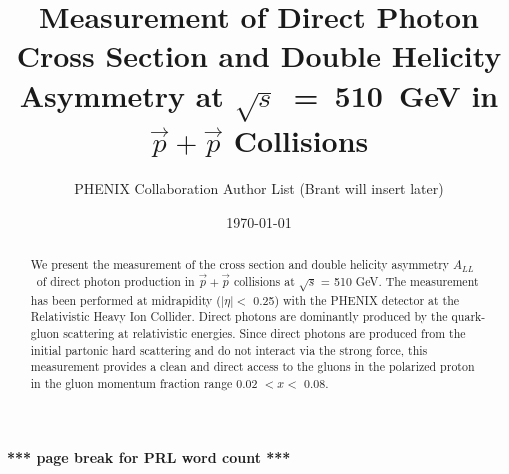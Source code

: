 \documentclass[twocolumn,letterpaper,aps,prl,longbibliography,superscriptaddress,floatfix]{revtex4-2}
\newcommand{\ALL}{\ensuremath{A_{LL}}}
\begin{document}


\title{Measurement of Direct Photon Cross Section and Double Helicity Asymmetry at \mbox{$\sqrt{s}$ = 510 GeV} in \mbox{$\vec{p}+\vec{p}$} Collisions}

\author{PHENIX Collaboration Author List (Brant will insert later)}

\date{\today}

\begin{abstract}
We present the measurement of the cross section and double helicity asymmetry \ALL\ of direct photon production in $\vec{p}+\vec{p}$ collisions at $\sqrt{s}$ = 510 GeV. The measurement has been performed at midrapidity ($|\eta| <$ 0.25) with the PHENIX detector at the Relativistic Heavy Ion Collider. Direct photons are dominantly produced by the quark-gluon scattering at relativistic energies. Since direct photons are produced from the initial partonic hard scattering and do not interact via the strong force, this measurement provides a clean and direct access to the gluons in the polarized proton in the gluon momentum fraction range 0.02 $< x <$ 0.08.
\end{abstract}

	
\maketitle

\textbf{*** page break for PRL word count ***}  \clearpage
\end{document}
